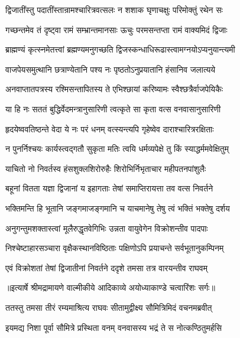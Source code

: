 \twolineshloka
{द्विजातींस्तु पदातींस्तान्रामश्चारित्रवत्सलः}
{न शशाक घृणाचक्षुः परिमोक्तुं रथेन सः} %

\twolineshloka
{गच्छन्तमेव तं दृष्ट्वा रामं सम्भ्रान्तमानसाः}
{ऊचुः परमसन्तप्ता रामं वाक्यमिदं द्विजाः} %

\twolineshloka
{ब्राह्मण्यं कृत्स्नमेतत्त्वां ब्रह्मण्यमनुगच्छति}
{द्विजस्कन्धाधिरूढास्त्वामग्नयोऽप्यनुयान्त्यमी} %

\twolineshloka
{वाजपेयसमुत्थानि छत्राण्येतानि पश्य नः}
{पृष्ठतोऽनुप्रयातानि हंसानिव जलात्यये} %

\twolineshloka
{अनवाप्तातपत्रस्य रश्मिसन्तापितस्य ते}
{एभिश्छायां करिष्यामः स्वैश्छत्रैर्वाजपेयिकैः} %

\twolineshloka
{या हि नः सततं बुद्धिर्वेदमन्त्रानुसारिणी}
{त्वत्कृते सा कृता वत्स वनवासानुसारिणी} %

\twolineshloka
{हृदयेष्ववतिष्ठन्ते वेदा ये नः परं धनम्}
{वत्स्यन्त्यपि गृहेष्वेव दाराश्चारित्ररक्षिताः} %

\twolineshloka
{न पुनर्निश्चयः कार्यस्त्वद्गतौ सुकृता मतिः}
{त्वयि धर्मव्यपेक्षे तु किं स्याद्धर्ममवेक्षितुम्} %

\twolineshloka
{याचितो नो निवर्तस्व हंसशुक्लशिरोरुहैः}
{शिरोभिर्निभृताचार महीपतनपांशुलैः} %

\twolineshloka
{बहूनां वितता यज्ञा द्विजानां य इहागताः}
{तेषां समाप्तिरायत्ता तव वत्स निवर्तने} %

\twolineshloka
{भक्तिमन्ति हि भूतानि जङ्गमाजङ्गमानि च}
{याचमानेषु तेषु त्वं भक्तिं भक्तेषु दर्शय} %

\twolineshloka
{अनुगन्तुमशक्तास्त्वां मूलैरुद्धृतवेगिभिः}
{उन्नता वायुवेगेन विक्रोशन्तीव पादपाः} %

\twolineshloka
{निश्चेष्टाहारसञ्चारा वृक्षैकस्थानविष्ठिताः}
{पक्षिणोऽपि प्रयाचन्ते सर्वभूतानुकम्पिनम्} %

\twolineshloka
{एवं विक्रोशतां तेषां द्विजातीनां निवर्तने}
{ददृशे तमसा तत्र वारयन्तीव राघवम्} %


{॥इत्यार्षे श्रीमद्रामायणे वाल्मीकीये आदिकाव्ये अयोध्याकाण्डे चत्वारिंशः सर्गः॥}


\twolineshloka
{ततस्तु तमसा तीरं रम्यमाश्रित्य राघवः}
{सीतामुद्वीक्ष्य सौमित्रिमिदं वचनमब्रवीत्} %

\twolineshloka
{इयमद्य निशा पूर्वा सौमित्रे प्रस्थिता वनम्}
{वनवासस्य भद्रं ते स नोत्कण्ठितुमर्हसि} %

